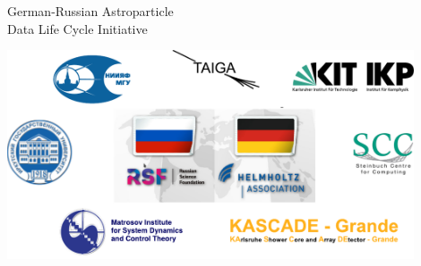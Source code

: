 \begin{frame}{German-Russian Astroparticle \\Data Life Cycle Initiative\footnotemark[1]}
\vspace{-1.4em}
\begin{center}
  \includegraphics[width=0.9\textwidth]{pics/Collab-4.pdf}
\end{center}
\footnotesize{}
\end{frame}

